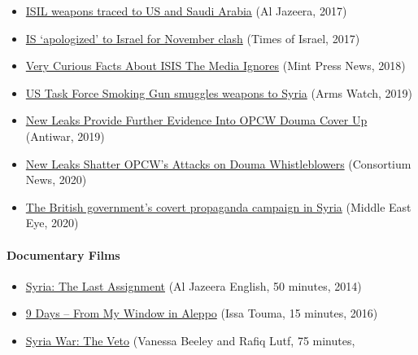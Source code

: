 \begin{itemize}
{  commandos save Islamic Militants from Syria} (Daily Mail, 2015)
\item
  \href{https://www.aljazeera.com/news/2017/12/isil-weapons-traced-saudi-arabia-171214164431586.html}{ISIL
  weapons traced to US and Saudi Arabia} (Al Jazeera, 2017)
\item
  \href{https://www.timesofisrael.com/ex-defense-minister-says-is-apologized-to-israel-for-november-clash/}{IS
  `apologized' to Israel for November clash} (Times of Israel, 2017)
\item
  \href{https://www.mintpressnews.com/10-curious-facts-isis-media-ignores/236996/}{Very
  Curious Facts About ISIS The Media Ignores} (Mint Press News, 2018)
\item
  \href{http://armswatch.com/us-task-force-smoking-gun-smuggles-weapons-to-syria-serbia-files-part-2/}{US
  Task Force Smoking Gun smuggles weapons to Syria} (Arms Watch, 2019)
\item
  \href{https://original.antiwar.com/dave_decamp/2019/12/15/new-leaks-provide-further-evidence-into-opcw-douma-cover-up/}{New
  Leaks Provide Further Evidence Into OPCW Douma Cover Up} (Antiwar,
  2019)
\item
  \href{https://consortiumnews.com/2020/02/11/new-leaks-shatter-opcws-attacks-on-douma-whistleblowers/}{New
  Leaks Shatter OPCW's Attacks on Douma Whistleblowers} (Consortium
  News, 2020)
\item
  \href{https://www.middleeasteye.net/news/revealed-british-government-covert-propaganda-campaign-syria}{The
  British government's covert propaganda campaign in Syria} (Middle East
  Eye, 2020)
\end{itemize}

\hypertarget{documentary-films}{%
\paragraph{Documentary Films}\label{documentary-films}}

\begin{itemize}
\tightlist
\item
  \href{https://www.youtube.com/watch?v=sRtyJitvg7U}{Syria: The Last
  Assignment} (Al Jazeera English, 50 minutes, 2014)
\item
  \href{https://www.youtube.com/watch?v=THdMj0-LmRw}{9 Days -- From My
  Window in Aleppo} (Issa Touma, 15 minutes, 2016)
\item
  \href{https://www.youtube.com/watch?v=5VMTfkP0jSQ}{Syria War: The
  Veto} (Vanessa Beeley and Rafiq Lutf, 75 minutes,
\end{itemize}

